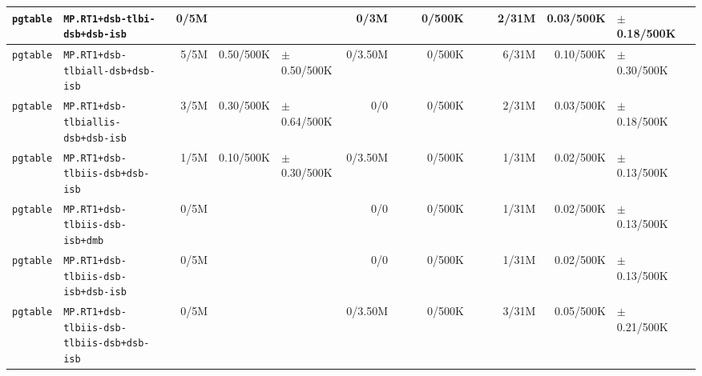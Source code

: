 \begin{tabular}{l l  | r r l | r r l | r r l | r r l l}
     \verb|pgtable| &                         \verb|MP.RT1+dsb-tlbi-dsb+dsb-isb| &           0/5M &                       &                   &           0/3M &                       &                 &         0/500K &                       &                   &          2/31M &             0.03/500K &   $\pm$ 0.18/500K & \\ \hline 
     \verb|pgtable| &                      \verb|MP.RT1+dsb-tlbiall-dsb+dsb-isb| &           5/5M &             0.50/500K &   $\pm$ 0.50/500K &        0/3.50M &                       &                 &         0/500K &                       &                   &          6/31M &             0.10/500K &   $\pm$ 0.30/500K & \\ \hline 
     \verb|pgtable| &                    \verb|MP.RT1+dsb-tlbiallis-dsb+dsb-isb| &           3/5M &             0.30/500K &   $\pm$ 0.64/500K &            0/0 &                       &                 &         0/500K &                       &                   &          2/31M &             0.03/500K &   $\pm$ 0.18/500K & \\ \hline 
     \verb|pgtable| &                       \verb|MP.RT1+dsb-tlbiis-dsb+dsb-isb| &           1/5M &             0.10/500K &   $\pm$ 0.30/500K &        0/3.50M &                       &                 &         0/500K &                       &                   &          1/31M &             0.02/500K &   $\pm$ 0.13/500K & \\ \hline 
     \verb|pgtable| &                       \verb|MP.RT1+dsb-tlbiis-dsb-isb+dmb| &           0/5M &                       &                   &            0/0 &                       &                 &         0/500K &                       &                   &          1/31M &             0.02/500K &   $\pm$ 0.13/500K & \\ \hline 
     \verb|pgtable| &                   \verb|MP.RT1+dsb-tlbiis-dsb-isb+dsb-isb| &           0/5M &                       &                   &            0/0 &                       &                 &         0/500K &                       &                   &          1/31M &             0.02/500K &   $\pm$ 0.13/500K & \\ \hline 
     \verb|pgtable| &            \verb|MP.RT1+dsb-tlbiis-dsb-tlbiis-dsb+dsb-isb| &           0/5M &                       &                   &        0/3.50M &                       &                 &         0/500K &                       &                   &          3/31M &             0.05/500K &   $\pm$ 0.21/500K & \\ \hline 

\end{tabular}
